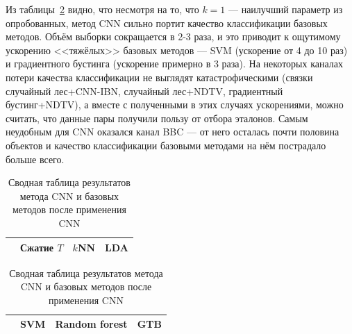 Из таблицы~\ref{table:cnn-results} видно, что несмотря на то, что \(k=1\) --- наилучший параметр из опробованных, метод CNN сильно портит качество классификации базовых методов. Объём выборки сокращается в 2-3 раза, и это приводит к ощутимому ускорению <<тяжёлых>> базовых методов --- SVM (ускорение от 4 до 10 раз) и градиентного бустинга (ускорение примерно в 3 раза). На некоторых каналах потери качества классификации не выглядят катастрофическими (связки случайный лес+CNN-IBN, случайный лес+NDTV, градиентный бустинг+NDTV), а вместе с полученными в этих случаях ускорениями, можно считать, что данные пары получили пользу от отбора эталонов. Самым неудобным для CNN оказался канал BBC --- от него осталась почти половина объектов и качество классификации базовыми методами на нём пострадало больше всего.

\begin{table}[h!]
    \centering
    \begin{tabular}{|c||c||c|c|}
		\cline{2-4}
		\multicolumn{1}{c||}{} & Сжатие \(T\) & \(k\)NN & LDA \\
		\hline \hline
		
	\end{tabular}
	\newline \vspace*{0.5cm} \newline
	\centering
	\begin{tabular}{|c||c|c|c|}
		\cline{2-4}
		\multicolumn{1}{c||}{} & SVM & Random forest & GTB \\
		\hline \hline
		
    \end{tabular}
    \caption{Сводная таблица результатов метода CNN и базовых методов после применения CNN}
    \label{table:cnn-results}
\end{table}

